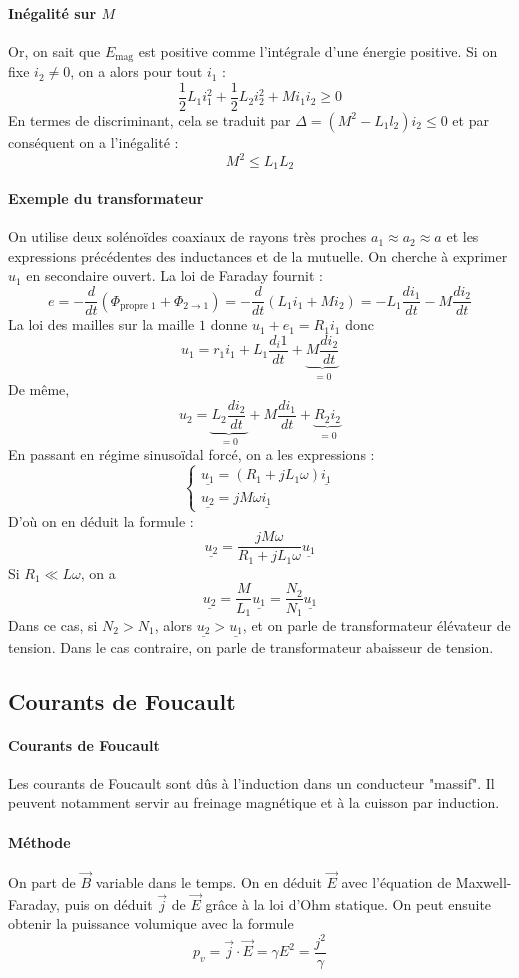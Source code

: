 \documentclass[french]{book}
\theoremstyle{plain}
\theoremstyle{definition}
\theoremstyle{remark}
\begin{document}
\paragraph{Inégalité sur $M$} Or, on sait que $E_\text{mag}$ est positive comme l'intégrale d'une énergie positive. Si on fixe $i_2\ne0$, on a alors pour tout $i_1$ : $$\frac{1}{2}L_1i_1^2+\frac{1}{2}L_2i_2^2+Mi_1i_2\geqslant 0$$ En termes de discriminant, cela se traduit par $\Delta=(M^2-L_1l_2)i_2\leqslant0$ et par conséquent on a l'inégalité : $$M^2\leqslant L_1L_2$$
\paragraph{Exemple du transformateur} On utilise deux solénoïdes coaxiaux de rayons très proches $a_1\approx a_2\approx a$ et les expressions précédentes des inductances et de la mutuelle. On cherche à exprimer $u_1$ en secondaire ouvert. La loi de Faraday fournit : $$e=-\frac{d}{dt}\left(\Phi_\text{propre 1}+\Phi_{2\to 1}\right)=-\frac{d}{dt}\left(L_1i_1+Mi_2\right)=-L_1\frac{di_1}{dt}-M\frac{di_2}{dt}$$La loi des mailles sur la maille $1$ donne $u_1+e_1=R_1i_1$ donc $$u_1=r_1i_1+L_1\frac{d_i1}{dt}+\underbrace{M\frac{di_2}{dt}}_{=0}$$ De même, $$u_2=\underbrace{L_2\frac{di_2}{dt}}_{=0}+M\frac{di_1}{dt}+\underbrace{R_2i_2}_{=0}$$ En passant en régime sinusoïdal forcé, on a les expressions : $$\begin{cases}
	\underline{u_1}=(R_1+jL_1\omega)\underline{i_1}\\
	\underline{u_2}=jM\omega\underline{i_1}
\end{cases}$$ D'où on en déduit la formule : $$\underline{u_2}=\frac{jM\omega}{R_1+jL_1\omega}\underline{u_1}$$ Si $R_1\ll L\omega$, on a $$\underline{u_2}=\frac{M}{L_1}\underline{u_1}=\frac{N_2}{N_1}\underline{u_1}$$ Dans ce cas, si $N_2>N_1$, alors $\underline{u_2}>\underline{u_1}$, et on parle de transformateur élévateur de tension. Dans le cas contraire, on parle de transformateur abaisseur de tension.
\subsection{Courants de Foucault}
\paragraph{Courants de Foucault} Les courants de Foucault sont dûs à l'induction dans un conducteur "massif". Il peuvent notamment servir au freinage magnétique et à la cuisson par induction.
\paragraph{Méthode} On part de $\overrightarrow{B}$ variable dans le temps. On en déduit $\overrightarrow{E}$ avec l'équation de Maxwell-Faraday, puis on déduit $\overrightarrow{j}$ de $\overrightarrow{E}$ grâce à la loi d'Ohm statique. On peut ensuite obtenir la puissance volumique avec la formule $$p_v=\overrightarrow{j}\cdot\overrightarrow{E}=\gamma E^2=\frac{j^2}{\gamma}$$
\end{document}
